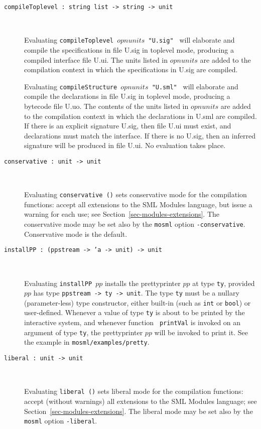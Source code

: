 \documentclass[fleqn,a4paper]{article}
\begin{document}
\begin{description}
\item[{\tt compileToplevel :\ string list -> string -> unit}]\mbox{ }
  
  Evaluating \texttt{compileToplevel $opnunits$ "{\rm U.sig}" }
  will elaborate and compile the specifications in file U.sig in
  toplevel mode, producing a compiled interface file U.ui.  The units
  listed in $opnunits$ are added to the compilation context in
  which the specifications in U.sig are compiled.
  
  Evaluating \texttt{compileStructure $opnunits$ "{\rm U.sml}"
    } will elaborate and compile the declarations in file U.sig in
  toplevel mode, producing a bytecode file U.uo.  The contents of the
  units listed in $opnunits$ are added to the compilation
  context in which the declarations in U.sml are compiled.  If there
  is an explicit signature U.sig, then file U.ui must exist, and
  declarations must match the interface.  If there is no U.sig, then
  an inferred signature will be produced in file U.ui.  No evaluation
  takes place.

\item[{\tt conservative :\ unit -> unit}]\mbox{ }
  
  Evaluating \texttt{conservative ()} sets conservative mode for the
  compilation functions: accept all extensions to the SML Modules
  language, but issue a warning for each use; see
  Section~\ref{sec-modules-extensions}.  The conservative mode may be
  set also by the \texttt{mosml} option \texttt{-conservative}.
  Conservative mode is the default.

\item[{\tt installPP :\ (ppstream -> 'a -> unit) -> unit}]\mbox{ }

  Evaluating {\tt installPP $pp$} installs the prettyprinter $pp$ at
  type {\tt ty}, provided $pp$ has type {\tt ppstream -> ty -> unit}.
  The type {\tt ty} must be a nullary (parameter-less) type
  constructor, either built-in (such as {\tt int} or {\tt bool}) or
  user-defined.  Whenever a value of type {\tt ty} is about to be
  printed by the interactive system, and whenever function {\tt
    printVal} is invoked on an argument of type {\tt ty}, the
  prettyprinter $pp$ will be invoked to print it.  See the example in
  {\tt mosml/examples/pretty}.

\item[{\tt liberal :\ unit -> unit}]\mbox{ }
  
  Evaluating \texttt{liberal ()} sets liberal mode for the compilation
  functions: accept (without warnings) all extensions to the SML
  Modules language; see Section~\ref{sec-modules-extensions}.  The
  liberal mode may be set also by the \texttt{mosml} option
  \texttt{-liberal}.


\end{description}
\end{document}
